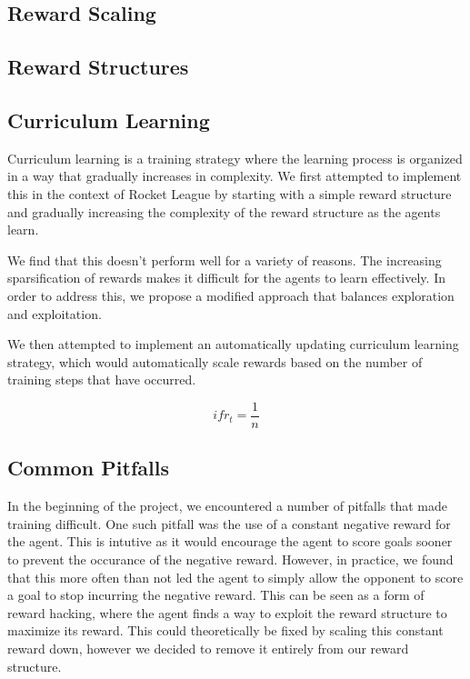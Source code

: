 \documentclass[conference]{IEEEtran}
\begin{document}
\subsection{Reward Scaling}


\subsection{Reward Structures}

\subsection{Curriculum Learning}
Curriculum learning is a training strategy where the learning process is organized in a way that gradually increases in complexity. We first attempted to implement this in the context of Rocket League by starting with a simple reward structure and gradually increasing the complexity of the reward structure as the agents learn.

We find that this doesn't perform well for a variety of reasons. The increasing sparsification of rewards makes it difficult for the agents to learn effectively. In order to address this, we propose a modified approach that balances exploration and exploitation.

We then attempted to implement an automatically updating curriculum learning strategy, which would automatically scale rewards based on the number of training steps that have occurred. 

\[
    if 
        r_t = \frac{1}{n}
\]

\subsection{Common Pitfalls}
In the beginning of the project, we encountered a number of pitfalls that made training difficult. One such pitfall was the use of a constant negative reward for the agent. This is intutive as it would encourage the agent to score goals sooner to prevent the occurance of the negative reward. However, in practice, we found that this more often than not led the agent to simply allow the opponent to score a goal to stop incurring the negative reward. This can be seen as a form of reward hacking, where the agent finds a way to exploit the reward structure to maximize its reward. This could theoretically be fixed by scaling this constant reward down, however we decided to remove it entirely from our reward structure.
\end{document}
